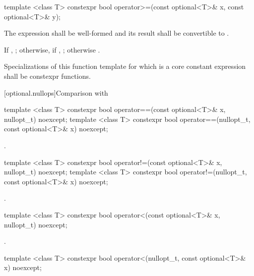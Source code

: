 %
\begin{itemdecl}
template <class T> constexpr bool operator>=(const optional<T>& x, const optional<T>& y);
\end{itemdecl}

\begin{itemdescr}
\pnum
\requires
The expression  shall be well-formed and
its result shall be convertible to .

\pnum
\returns
If , ;
otherwise, if , ;
otherwise .

\pnum
\remarks
Specializations of this function template
for which  is a core constant expression
shall be constexpr functions.
\end{itemdescr}

[optional.nullops]{Comparison with }

%
\begin{itemdecl}
template <class T> constexpr bool operator==(const optional<T>& x, nullopt_t) noexcept;
template <class T> constexpr bool operator==(nullopt_t, const optional<T>& x) noexcept;
\end{itemdecl}

\begin{itemdescr}
\pnum
\returns
{}.
\end{itemdescr}

%
\begin{itemdecl}
template <class T> constexpr bool operator!=(const optional<T>& x, nullopt_t) noexcept;
template <class T> constexpr bool operator!=(nullopt_t, const optional<T>& x) noexcept;
\end{itemdecl}

\begin{itemdescr}
\pnum
\returns
{}.
\end{itemdescr}

%
\begin{itemdecl}
template <class T> constexpr bool operator<(const optional<T>& x, nullopt_t) noexcept;
\end{itemdecl}

\begin{itemdescr}
\pnum
\returns
{}.
\end{itemdescr}

%
\begin{itemdecl}
template <class T> constexpr bool operator<(nullopt_t, const optional<T>& x) noexcept;
\end{itemdecl}

